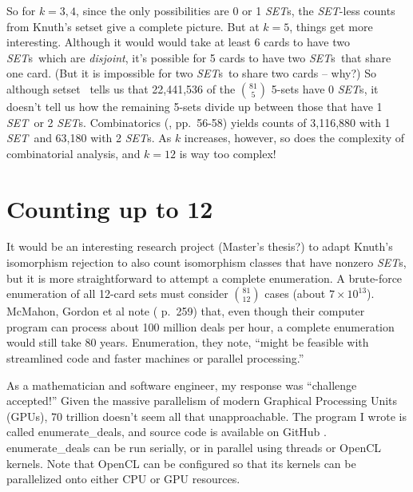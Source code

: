 \documentclass{article}
\newcommand{\SET}{{\em SET}}
\newcommand{\SETs}{{\em SET}s}
\newcommand{\SETSETb}{{\sc setset }}
\newcommand{\ED}{{\sc enumerate\_deals}}
\newcommand{\EDb}{{\sc enumerate\_deals }}
\begin{document}
So for $k=3,4$, since the only possibilities are 0 or 1 \SETs, the \SET-less
counts from Knuth's \SETSETb give a complete picture. But at $k=5$, things get
more interesting. Although it would would take at least 6 cards to have two
\SETs~which are {\em disjoint}, it's possible for 5 cards to have two \SETs~that
share one card. (But it is impossible for two \SETs~to share two cards -- why?)
So although \SETSETb~tells us that 22,441,536 of the $\binom{81}{5}$ 5-sets have
0 \SETs, it doesn't tell us how the remaining 5-sets divide up between those
that have 1 \SET~or 2 \SETs. Combinatorics (\cite{JOS}, pp.~56-58) yields counts
of 3,116,880 with 1 \SET~and 63,180 with 2 \SETs. As $k$ increases, however, so
does the complexity of combinatorial analysis, and $k=12$ is way too complex!

\section{Counting up to 12}
It would be an interesting research project (Master's thesis?) to adapt Knuth's
isomorphism rejection to also count isomorphism classes that have nonzero \SETs,
but it is more straightforward to attempt a complete enumeration. A brute-force
enumeration of all 12-card sets must consider $\binom{81}{12}$ cases (about
$7\times 10^{13}$). McMahon, Gordon et al note (\cite{JOS} p.~259) that, even
though their computer program can process about 100 million deals per hour, a
complete enumeration would still take 80 years. Enumeration, they note, ``might
be feasible with streamlined code and faster machines or parallel processing.''

As a mathematician and software engineer, my response was ``challenge
accepted!'' Given the massive parallelism of modern Graphical Processing Units
(GPUs), 70 trillion doesn't seem all that unapproachable. The program I wrote is
called \ED, and source code is available on GitHub \cite{ME}. \EDb can be run
serially, or in parallel using threads or OpenCL \cite{OPENCL} kernels. Note
that OpenCL can be configured so that its kernels can be parallelized onto
either CPU or GPU resources.
\end{document}

